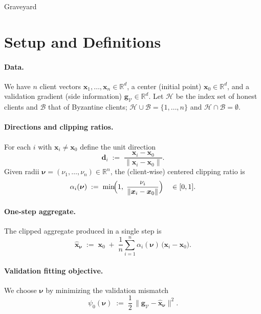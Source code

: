 \documentclass{article}
\theoremstyle{plain}
\theoremstyle{definition}
\theoremstyle{remark}
\begin{document}
\clearpage
\appendix

\bigskip
\center\Huge{Graveyard}
\section*{Setup and Definitions}

\paragraph{Data.}
We have $n$ client vectors $\bm{x}_1,\dots,\bm{x}_n\in\mathbb{R}^d$, a center (initial point) $\bm{x}_0\in\mathbb{R}^d$, 
and a validation gradient (side information) $\bm{g}_{\mathcal{V}}\in\mathbb{R}^d$.
Let $\mathcal{H}$ be the index set of honest clients and $\mathcal{B}$ that of Byzantine clients; $\mathcal{H}\cup \mathcal{B}=\{1,\dots,n\}$ and $\mathcal{H}\cap \mathcal{B}=\emptyset$.

\paragraph{Directions and clipping ratios.}
For each $i$ with $\bm{x}_i\ne \bm{x}_0$ define the unit direction
\begin{equation}
\bm{d}_i \;:=\; \frac{\bm{x}_i-\bm{x}_0}{\|\bm{x}_i-\bm{x}_0\|}.
\label{eq:def-di}
\end{equation}
Given radii $\bm{\nu}=(\nu_1,\dots,\nu_n)\in \mathbb{R}^n$, the (client‑wise) centered clipping ratio is
\begin{equation}
\alpha_i(\bm{\nu}) \;:=\; \min\!\Bigl(1,\; \frac{\nu_i}{\|\bm{x}_i-\bm{x}_0\|}\Bigr)
\quad\in[0,1].
\label{eq:def-alpha}
\end{equation}

\paragraph{One-step aggregate.}
The clipped aggregate produced in a single step is
\begin{equation}
\hat {\bm{x}}_{\bm{\nu}} \;:=\; \bm{x}_0 \;+\; \frac{1}{n}\sum_{i=1}^n \alpha_i(\bm{\nu})\,\bigl(\bm{x}_i-\bm{x}_0\bigr).
\label{eq:def-xhat}
\end{equation}

\paragraph{Validation fitting objective.}
We choose $\bm{\nu}$ by minimizing the validation mismatch
\begin{equation}
\psi_0(\bm{\nu})\;:=\; \frac12 \,\bigl\|\bm{g}_{\mathcal{V}} - \hat {\bm{x}}_{\bm{\nu}}\bigr\|^2.
\label{eq:def-psi0}
\end{equation}
\end{document}

